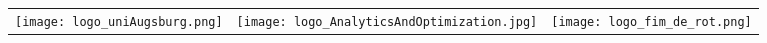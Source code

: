 \documentclass[
fontsize=11pt, %
headsepline, %
chapterprefix, %
numbers=noenddot, %
listof=totoc, %
index=totoc, %
bibliography=totoc, %
]%
{scrbook}%
\begin{document}
	
\begin{tabularx}{\textwidth}{LYR}
	\texttt{[image: logo\_uniAugsburg.png]} &
		\texttt{[image: logo\_AnalyticsAndOptimization.jpg]} &
	\texttt{[image: logo\_fim\_de\_rot.png]}
\end{tabularx}

%

\end{document}
